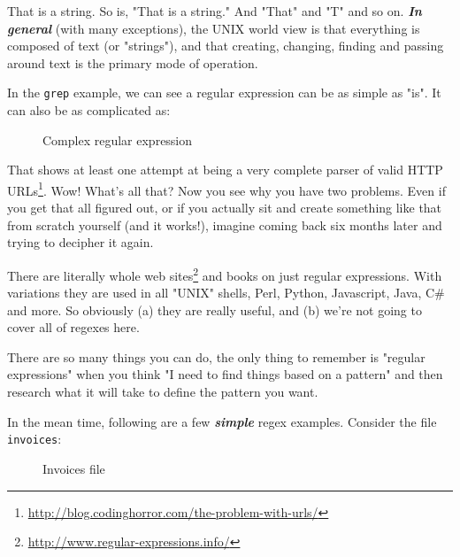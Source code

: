 \documentclass[10pt,american,]{book}
\newenvironment{Shaded}{\begin{snugshade}}{\end{snugshade}}
\newcommand{\KeywordTok}[1]{\textcolor[rgb]{0.13,0.29,0.53}{\textbf{{#1}}}}
\newcommand{\NormalTok}[1]{{#1}}
\renewcommand{\href}[2]{#2\footnote{\url{#1}}}
\numberwithin{figure}{chapter}
\DeclareRobustCommand{\drcap}[1]{\begin{figure}[H]\caption{#1}\end{figure}}
\renewcommand{\KeywordTok}[1]{{#1}}
\renewcommand{\NormalTok}[1]{{#1}}
\begin{document}
That is a string. So is, "That is a string." And "That" and "T" and so
on. \textbf{\emph{In general}} (with many exceptions), the UNIX world
view is that everything is composed of text (or "strings"), and that
creating, changing, finding and passing around text is the primary mode
of operation.

In the \texttt{grep} example, we can see a regular expression can be as
simple as "is". It can also be as complicated as:

\drcap{Complex regular expression}

\begin{Shaded}
\begin{Highlighting}[]
\KeywordTok{(?bhttp}\NormalTok{://[-A-Za-z0-9+}\KeywordTok{&@}\NormalTok{#/%
\end{Highlighting}
\end{Shaded}

That shows at least one attempt at being
\href{http://blog.codinghorror.com/the-problem-with-urls/}{a very
complete parser of valid HTTP URLs}. Wow! What's all that? Now you see
why you have two problems. Even if you get that all figured out, or if
you actually sit and create something like that from scratch yourself
(and it works!), imagine coming back six months later and trying to
decipher it again.

There are literally \href{http://www.regular-expressions.info/}{whole
web sites} and books on just regular expressions. With variations they
are used in all "UNIX" shells, Perl, Python, Javascript, Java, C\# and
more. So obviously (a) they are really useful, and (b) we're not going
to cover all of regexes here.

There are so many things you can do, the only thing to remember is
"regular expressions" when you think "I need to find things based on a
pattern" and then research what it will take to define the pattern you
want.

In the mean time, following are a few \textbf{\emph{simple}} regex
examples. Consider the file \texttt{invoices}:

\drcap{Invoices file}

\begin{Shaded}
\end{Shaded}
\end{document}
